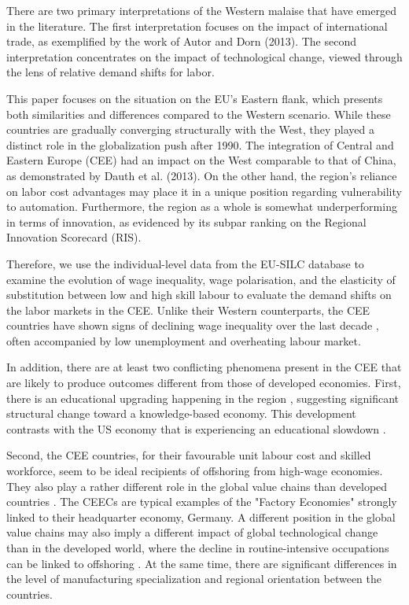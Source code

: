 \documentclass[11pt]{article}
\begin{document}
There are two primary interpretations of the Western malaise that have emerged in the literature. The first interpretation focuses on the impact of international trade, as exemplified by the work of Autor and Dorn (2013). The second interpretation concentrates on the impact of technological change, viewed through the lens of relative demand shifts for labor. 

This paper focuses on the situation on the EU's Eastern flank, which presents both similarities and differences compared to the Western scenario. While these countries are gradually converging structurally with the West, they played a distinct role in the globalization push after 1990. The integration of Central and Eastern Europe (CEE) had an impact on the West comparable to that of China, as demonstrated by Dauth et al. (2013). On the other hand, the region's reliance on labor cost advantages may place it in a unique position regarding vulnerability to automation. Furthermore, the region as a whole is somewhat underperforming in terms of innovation, as evidenced by its subpar ranking on the Regional Innovation Scorecard (RIS).


Therefore, we use the individual-level data from the EU-SILC database to examine the evolution of wage inequality, wage polarisation, and the elasticity of substitution between low and high skill labour to evaluate the demand shifts on the labor markets in the CEE. Unlike their Western counterparts, the CEE countries have shown signs of declining wage inequality over the last decade \citep{magda2021firms}, often accompanied by low unemployment and overheating labour market.

In addition, there are at least two conflicting phenomena present in the CEE that are likely to produce outcomes different from those of developed economies. First, there is an educational upgrading happening in the region \citep{hardy2018educational}, suggesting significant structural change toward a knowledge-based economy. This development contrasts with the US economy that is experiencing an educational slowdown \citep{goldin2010race}.

Second, the CEE countries, for their favourable unit labour cost and skilled workforce, seem to be ideal recipients of offshoring from high-wage economies. They also play a rather different role in the global value chains than developed countries \citep{baldwin2015supply}. The CEECs are typical examples of the "Factory Economies" strongly linked to their headquarter economy, Germany. 
A different position in the global value chains may also imply a different impact of global technological change than in the developed world, where the decline in routine-intensive occupations can be linked to offshoring \citep{acemoglu2012does}. At the same time, there are significant differences in the level of manufacturing specialization and regional orientation between the countries.
\end{document}

